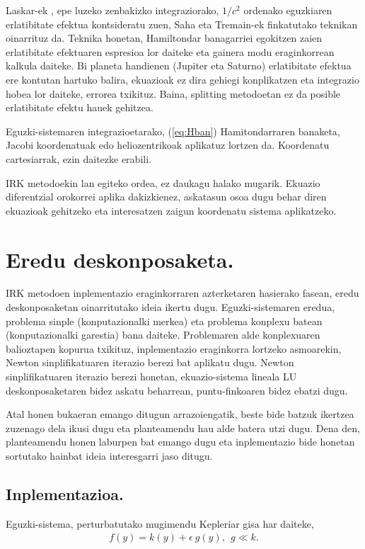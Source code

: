 Laskar-ek \cite[2011]{Laskar2011}, epe luzeko zenbakizko integraziorako, $1/c^2$ ordenako eguzkiaren erlatibitate efektua   kontsideratu zuen, Saha eta Tremain-ek \cite{Saha1994} finkatutako teknikan oinarrituz da. Teknika honetan, Hamiltondar banagarriei egokitzen zaien erlatibitate efektuaren espresioa lor daiteke eta gainera modu eraginkorrean kalkula daiteke. Bi planeta handienen (Jupiter eta Saturno) erlatibitate efektua ere kontutan hartuko balira, ekuazioak ez dira gehiegi konplikatzen eta integrazio hobea lor daiteke, errorea txikituz. Baina, splitting metodoetan ez da posible erlatibitate efektu hauek gehitzea.
 
Eguzki-sistemaren integrazioetarako, (\ref{eq:Hban}) Hamitondarraren banaketa, Jacobi koordenatuak edo heliozentrikoak aplikatuz lortzen da.
Koordenatu cartesiarrak, ezin daitezke erabili.

IRK metodoekin lan egiteko ordea, ez daukagu halako mugarik. Ekuazio diferentzial orokorrei aplika dakizkienez, askatasun osoa dugu behar diren ekuazioak gehitzeko eta interesatzen zaigun koordenatu sistema aplikatzeko.  


\section{Eredu deskonposaketa.}


IRK metodoen inplementazio eraginkorraren azterketaren hasierako fasean, eredu deskonposaketan oinarritutako ideia ikertu dugu. Eguzki-sistemaren eredua, problema sinple (konputazionalki merkea) eta problema konplexu batean (konputazionalki garestia) bana daiteke.   
Problemaren alde konplexuaren balioztapen kopurua txikituz, inplementazio eraginkorra lortzeko asmoarekin, Newton sinplifikatuaren iterazio berezi bat aplikatu dugu. Newton sinplifikatuaren iterazio berezi honetan, ekuazio-sistema lineala LU deskonposaketaren bidez askatu beharrean, puntu-finkoaren bidez ebatzi dugu.

Atal honen bukaeran emango ditugun arrazoiengatik, beste bide batzuk ikertzea zuzenago dela ikusi dugu eta planteamendu hau alde batera utzi dugu. Dena den, planteamendu honen laburpen bat emango dugu eta inplementazio bide honetan sortutako hainbat ideia interesgarri jaso ditugu.

\subsection*{Inplementazioa.}
Eguzki-sistema, perturbatutako mugimendu Kepleriar gisa har daiteke,  
\begin{align}
\label{eq:fkg}
 f(y)=  k(y) + \epsilon \ g (y), \ \ g\ll k.   
\end{align}
 
